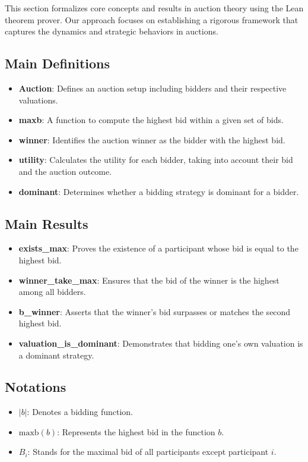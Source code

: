 This section formalizes core concepts and results in auction theory using the Lean theorem prover. Our approach focuses on establishing a rigorous framework that captures the dynamics and strategic behaviors in auctions.

\subsection{Main Definitions}

\begin{itemize}
    \item \textbf{Auction}: Defines an auction setup including bidders and their respective valuations.
    \item \textbf{maxb}: A function to compute the highest bid within a given set of bids.
    \item \textbf{winner}: Identifies the auction winner as the bidder with the highest bid.
    \item \textbf{utility}: Calculates the utility for each bidder, taking into account their bid and the auction outcome.
    \item \textbf{dominant}: Determines whether a bidding strategy is dominant for a bidder.
\end{itemize}

\subsection{Main Results}

\begin{itemize}
    \item \textbf{exists\_max}: Proves the existence of a participant whose bid is equal to the highest bid.
    \item \textbf{winner\_take\_max}: Ensures that the bid of the winner is the highest among all bidders.
    \item \textbf{b\_winner}: Asserts that the winner's bid surpasses or matches the second highest bid.
    \item \textbf{valuation\_is\_dominant}: Demonstrates that bidding one's own valuation is a dominant strategy.
\end{itemize}

\subsection{Notations}

\begin{itemize}
    \item \( |b| \): Denotes a bidding function.
    \item \( \text{maxb}(b) \): Represents the highest bid in the function \( b \).
    \item \( B_i \): Stands for the maximal bid of all participants except participant \( i \).
\end{itemize}

